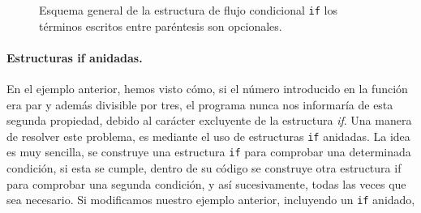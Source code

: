 \begin{figure}[h]
\centering
{}
\caption{Esquema general de la estructura de flujo condicional \texttt{if} los términos escritos entre paréntesis son opcionales.}
\label{fig:if}
\end{figure} 

\paragraph{Estructuras if anidadas.} 
En el ejemplo anterior, hemos visto cómo, si el número introducido en la función era par y además divisible por tres, el programa nunca nos informaría de esta segunda propiedad, debido al carácter excluyente de la estructura \emph{if}. Una manera de resolver este problema, es mediante el uso de estructuras \texttt{if} anidadas. La idea es muy sencilla, se construye una estructura \texttt{if} para comprobar una determinada condición, si esta se cumple, dentro de su código se construye otra estructura if para comprobar una segunda condición, y así sucesivamente, todas las veces que sea necesario. Si modificamos nuestro ejemplo anterior, incluyendo un \texttt{if} anidado,

